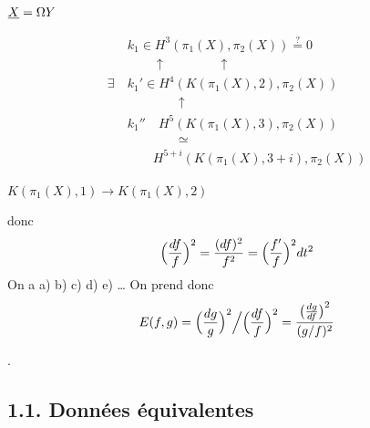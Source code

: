 \documentclass[11pt,a4paper]{article}
\begin{document}

$\uncertain{X} = \Omega Y$

\[
\begin{aligned}
&k_1 \in H^3(\pi_1(X), \pi_2(X)) \overset{?}{=} 0\\
&\qquad\uparrow \qquad\qquad \uparrow\\
\exists\ &k_1' \in H^4(K(\pi_1(X),2), \pi_2(X))\\
&\qquad\qquad \uparrow\\
&k_1'' \quad H^5(K(\pi_1(X),3), \pi_2(X))\\
&\qquad\qquad \simeq\\
&\qquad H^{5+i}(K(\pi_1(X),3+i), \pi_2(X))
\end{aligned}
\]

 $K(\pi_1(X),1) \longrightarrow K(\pi_1(X),2)$



donc
\[
\Bigl(\frac{df}{f}\Bigr)^2 = \frac{(df)^2}{f^2} = \Bigl(\frac{f'}{f}\Bigr)^2 dt^2
\]
On a a) b) c) d) e) … On prend donc
\[
E(f,g) = \Bigl(\frac{dg}{g}\Bigr)^2 \Big/ \Bigl(\frac{df}{f}\Bigr)^2 = \frac{\bigl(\frac{dg}{df}\bigr)^2}{(g/f)^2}
\]


 .

\subsection*{1.1. Données équivalentes}
\end{document}
